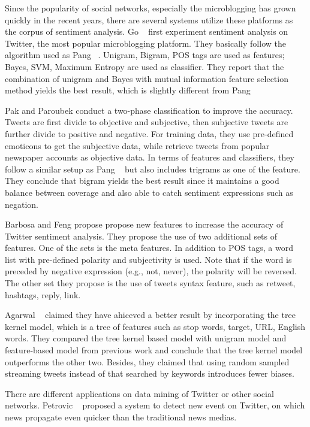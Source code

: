 \documentclass[12pt]{article}
\begin{document}
Since the popularity of social networks, especially the microblogging has grown quickly in the recent years, there are several systems utilize these platforms as the corpus of sentiment analysis. Go \etal~\cite{Go:09} first experiment sentiment analysis on Twitter, the most popular microblogging platform. They basically follow the algorithm used as Pang \etal~\cite{Pang:02}. Unigram, Bigram, POS tags are used as features; Bayes, SVM, Maximum Entropy are used as classifier. They report that the combination of unigram and Bayes with mutual information feature selection method yields the best result, which is slightly different from Pang \etal~\cite{Pang:02}

Pak and Paroubek \cite{Pak:10} conduct a two-phase classification to improve the accuracy. Tweets are first divide to objective and subjective, then subjective tweets are further divide to positive and negative. For training data, they use pre-defined emoticons to get the subjective data, while retrieve tweets from popular newspaper accounts as objective data. In terms of features and classifiers, they follow a similar setup as Pang \etal~\cite{Pang:02} but also includes trigrams as one of the feature. They conclude that bigram yields the best result since it maintains a good balance between coverage and also able to catch sentiment expressions such as negation.

Barbosa and Feng \cite{Barbosa:10} propose propose new features to increase the accuracy of Twitter sentiment analysis. They propose the use of two additional sets of features. One of the sets is the meta features. In addition to POS tags, a word list with pre-defined polarity and subjectivity is used. Note that if the word is preceded by negative expression (e.g., not, never), the polarity will be reversed. The other set they propose is the use of tweets syntax feature, such as retweet, hashtags, reply, link.

Agarwal \etal~\cite{Agarwal:11} claimed they have ahiceved a better result by incorporating the tree kernel model, which is a tree of features such as stop words, target, URL, English words. They compared the tree kernel based model with unigram model and feature-based model from previous work and conclude that the tree kernel model outperforms the other two. Besides, they claimed that using random sampled streaming tweets instead of that searched by keywords introduces fewer biases.

There are different applications on data mining of Twitter or other social networks. Petrovic \etal~\cite{Petrovic:10} proposed a system to detect new event on Twitter, on which news propagate even quicker than the traditional news medias.
\end{document}
